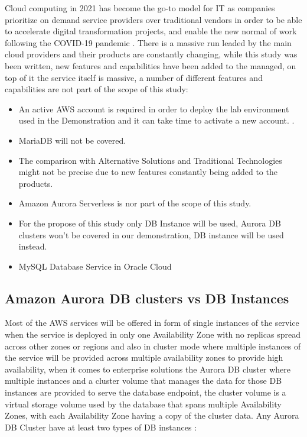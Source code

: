 \documentclass{article}
\begin{document}
Cloud computing in 2021 has become the go-to model for IT as companies prioritize on demand service providers over traditional vendors in order to be able to accelerate digital transformation projects, and enable the new normal of work following the COVID-19 pandemic \cite{dignan2021}. There is a massive run leaded by the main cloud providers and their products are constantly changing, while this study was been written, new features and capabilities have been added to the managed, on top of it the service itself is massive, a number of different features and capabilities are not part of the scope of this study:  

\begin{itemize}
    \item An active AWS account is required in order to deploy the lab environment used in the Demonstration and it can take time to activate a new account. \cite{createaccount}. 
    \item MariaDB will not be covered. 
    \item The comparison with Alternative Solutions and Traditional Technologies might not be precise due to new features constantly being added to the products.\cite{rdsvsazure2019} 
    \item Amazon Aurora Serverless is nor part of the scope of this study. 
    \item For the propose of this study only DB Instance will be used, Aurora DB clusters won't be covered in our demonstration, DB instance will be used instead.
    \item MySQL Database Service in Oracle Cloud
\end{itemize}
 
\subsection{Amazon Aurora DB clusters vs DB Instances}    

Most of the AWS services will be offered in form of single instances of the service when the service is deployed in only one Availability Zone with no replicas spread across other zones or regions and also in cluster mode where multiple instances of the service will be provided across multiple availability zones to provide high availability,  when it comes to enterprise solutions the Aurora DB cluster where multiple instances and a cluster volume that manages the data for those DB instances are provided to serve the database endpoint, the cluster volume is a virtual storage volume used by the database that spans multiple Availability Zones, with each Availability Zone having a copy of the cluster data. Any Aurora DB Cluster have at least two types of DB instances \cite{amazon2006amazon}:
\end{document}
